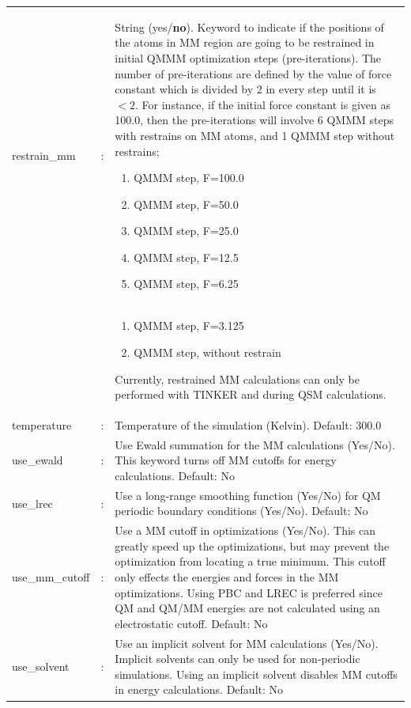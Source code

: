 \documentclass[12pt]{report}
\begin{document}
\begin{center}
\begin{longtable}{ p{4cm} c p{12.5cm}}
restrain\_mm & :  &
String (yes/\textbf{no}).
Keyword to indicate if
the positions of the atoms in
MM region are going to be
restrained in initial QMMM
optimization steps (pre-iterations).
The number of pre-iterations are
defined by the value of force constant
which is divided by 2 in every step
until it is $<2$. For instance, if the
initial force
constant is given as 100.0,
then the pre-iterations
will involve 6 QMMM steps with
restrains on MM atoms,
and 1
QMMM step without restrains;\newline
\begin{enumerate}
\item QMMM step, F=100.0
\item QMMM step, F=50.0
\item QMMM step, F=25.0
\item QMMM step, F=12.5
\item QMMM step, F=6.25
    \newcounter{enumTemp}
    \setcounter{enumTemp}{\theenumi}
\end{enumerate} \\
&  &\vspace*{-18pt}
\begin{enumerate}
 \setcounter{enumi}{\theenumTemp}
\item QMMM step, F=3.125
\item QMMM step, without restrain
\end{enumerate}
Currently, restrained MM calculations can only
be performed with TINKER and during QSM calculations. \newline \\

temperature & : & Temperature of the simulation (Kelvin).
Default: 300.0 \newline\\

use\_ewald & : & Use Ewald summation for the MM calculations (Yes/No).
This keyword turns off MM cutoffs for energy calculations.
Default: No \newline\\

use\_lrec & : & Use a long-range smoothing function (Yes/No) for QM periodic
boundary conditions (Yes/No).
Default: No \newline\\

use\_mm\_cutoff & : & Use a MM cutoff in optimizations (Yes/No).
This can greatly speed up the optimizations, but may prevent the optimization
from locating a true minimum.
This cutoff only effects the energies and forces in the MM optimizations.
Using PBC and LREC is preferred since QM and QM/MM energies are not calculated
using an electrostatic cutoff.
Default: No \newline\\

use\_solvent & : & Use an implicit solvent for MM calculations (Yes/No).
Implicit solvents can only be used for non-periodic simulations.
Using an implicit solvent disables MM cutoffs in energy calculations.
Default: No
\end{longtable}
\end{center}
\vspace*{-6pt}
\end{document}
